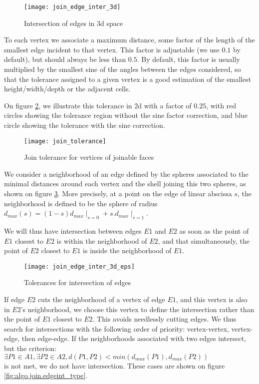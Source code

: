 \begin{figure}[!h]
\centerline{
\texttt{[image: join\_edge\_inter\_3d]}}
\caption{Intersection of edges in 3d space}
\label{fig:algo.join.edge}
\end{figure}

To each vertex we associate a maximum distance, some factor of
the length of the smallest edge incident to that vertex.
This factor is adjustable (we use $0.1$ by default), but
should always be less than $0.5$.
By default, this factor is usually multiplied by the smallest sine
of the angles between the edges considered, so that the
tolerance assigned to a given vertex is a good estimation
of the smallest height/width/depth or the adjacent cells.

On figure \ref{fig:algo.join.tolerance}, we illustrate
this tolerance in 2d with a factor of $0.25$, with red circles
showing the tolerance region without the sine factor
correction, and blue circle showing the tolerance with
the sine correction.

\begin{figure}[!h]
\centerline{
\texttt{[image: join\_tolerance]}}
\caption{Join tolerance for vertices of joinable faces}
\label{fig:algo.join.tolerance}
\end{figure}

We consider a neighborhood of an edge defined by the spheres
associated to the minimal distances around each vertex and
the shell joining this two spheres, as shown on figure
\ref{fig:algo.join.edgeint_eps}.
More precisely, at a point on the edge of linear abscissa $s$,
the neighborhood is defined to be the sphere of radius
$d_{max}(s) = (1-s)d_{max}\mid_{s=0} + s.d_{max}\mid_{s=1}$.

We will thus have intersection between edges $E1$ and $E2$ as soon
as the point of $E1$ closest to $E2$ is within the neighborhood
of $E2$, and that simultaneously, the point of $E2$ closest
to $E1$ is inside the neighborhood of $E1$.

\begin{figure}[!h]
\centerline{
\texttt{[image: join\_edge\_inter\_3d\_eps]}}
\caption{Tolerances for intersection of edges}
\label{fig:algo.join.edgeint_eps}
\end{figure}

If edge $E2$ cuts the neighborhood of a vertex of edge $E1$,
and this vertex is also in $E2$'s neighborhood, we choose this
vertex to define the intersection rather than the point of
$E1$ closest to $E2$. This avoids needlessly cutting edges.
We thus search for intersections with the following order
of priority: vertex-vertex, vertex-edge, then edge-edge.
If the neighborhoods associated with two edges intersect,
but the criterion:\\
$\exists P1 \in A1, \exists P2 \in A2, d(P1,P2)
 < min(d_{max}(P1), d_{max}(P2))$\\
is not met, we do not have
intersection. These cases are shown on figure
\ref{fig:algo.join.edgeint_type}.


